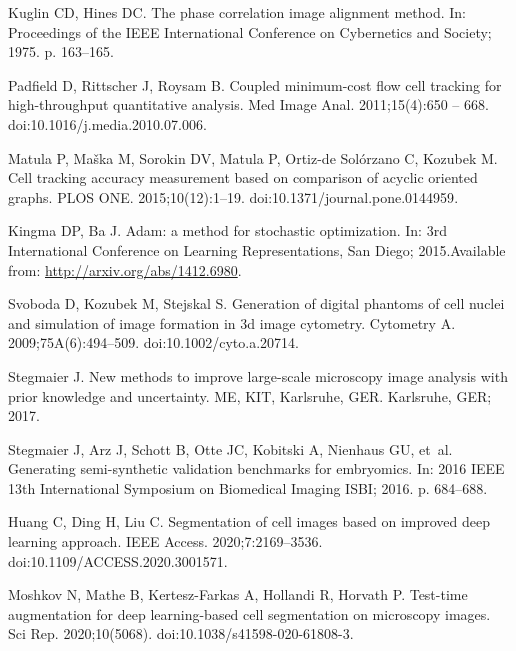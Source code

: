 \documentclass[10pt,letterpaper]{article}
\begin{document}
\begin{thebibliography}{10}
Kuglin CD, Hines DC.
\newblock The phase correlation image alignment method.
\newblock In: Proceedings of the IEEE International Conference on Cybernetics
  and Society; 1975. p. 163--165.

Padfield D, Rittscher J, Roysam B.
\newblock Coupled minimum-cost flow cell tracking for high-throughput
  quantitative analysis.
\newblock Med Image Anal. 2011;15(4):650 -- 668.
\newblock doi:{10.1016/j.media.2010.07.006}.

Matula P, Maška M, Sorokin DV, Matula P, Ortiz-de Solórzano C, Kozubek M.
\newblock Cell tracking accuracy measurement based on comparison of acyclic
  oriented graphs.
\newblock PLOS ONE. 2015;10(12):1--19.
\newblock doi:{10.1371/journal.pone.0144959}.

Kingma DP, Ba J.
\newblock Adam: a method for stochastic optimization.
\newblock In: 3rd International Conference on Learning Representations, San
  Diego; 2015.Available from: \url{http://arxiv.org/abs/1412.6980}.

Svoboda D, Kozubek M, Stejskal S.
\newblock Generation of digital phantoms of cell nuclei and simulation of image
  formation in 3d image cytometry.
\newblock Cytometry A. 2009;75A(6):494--509.
\newblock doi:{10.1002/cyto.a.20714}.

Stegmaier J.
\newblock New methods to improve large-scale microscopy image analysis with
  prior knowledge and uncertainty.
\newblock ME, KIT, Karlsruhe, GER. Karlsruhe, GER; 2017.

Stegmaier J, Arz J, Schott B, Otte JC, Kobitski A, Nienhaus GU, et~al.
\newblock Generating semi-synthetic validation benchmarks for embryomics.
\newblock In: 2016 IEEE 13th International Symposium on Biomedical Imaging
  ISBI; 2016. p. 684--688.
  
{Huang} C, {Ding} H, {Liu} C.
\newblock Segmentation of cell images based on improved deep learning approach.
\newblock IEEE Access. 2020;7:2169--3536.
\newblock doi:{10.1109/ACCESS.2020.3001571}.

Moshkov N, Mathe B, Kertesz-Farkas A, Hollandi R, Horvath P.
\newblock Test-time augmentation for deep learning-based cell segmentation on
  microscopy images.
\newblock Sci Rep. 2020;10(5068).
\newblock doi:{10.1038/s41598-020-61808-3}.

\end{thebibliography}
\end{document}
